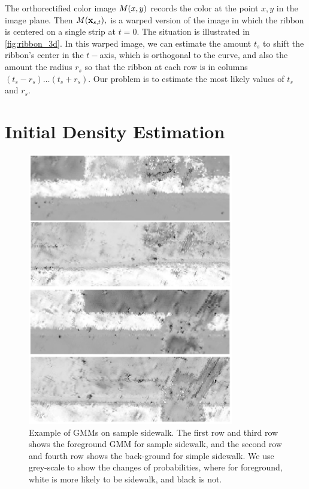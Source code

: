 The orthorectified color image $M(x,y)$
records the color at the point $x,y$ in the image plane.
Then $M(\mathbf{x}_{s,t}),$ is a warped version of the image in which the ribbon is centered on a single strip at $t=0$.
The situation is illustrated in \ref{fig:ribbon_3d}.  
In this warped image, we can estimate the amount $t_s$ to shift the ribbon's center in the $t-$axis, which is orthogonal to the curve,  and also the amount the radius $r_s$ so that the  ribbon at each row is in columns $(t_s - r_s)\dots(t_s+r_s)$.  
Our problem is to estimate the most likely values of $t_s$ and $r_s$.  


\section{Initial Density Estimation}

\begin{figure}[H]
    \centering
    \includegraphics[width=0.8\textwidth]{Figures/gmm_sample_1.png}
    \caption[\ac{GMM} Result 1]{Example of GMMs on sample sidewalk. The first row and third row shows the foreground GMM for sample sidewalk, and the second row and fourth row shows the back-ground for simple sidewalk. We use grey-scale to show the changes of probabilities, where for foreground, white is more likely to be sidewalk, and black is not.}
    \label{fig:GMM_result}
\end{figure}


